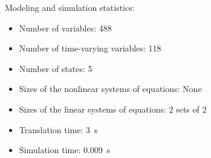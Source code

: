 \begin{contextbox}
  Modeling and simulation statistics:
  \begin{itemize}
    \item Number of variables: 488
    \item Number of time-varying variables: 118
    \item Number of states: 5
    \item Sizes of the nonlinear systems of equations: None
    \item Sizes of the linear systems of equations: 2 sets of 2
    \item Translation time: \SI{3}{s}
    \item Simulation time: \SI{0.009}{s}
  \end{itemize}
\end{contextbox}